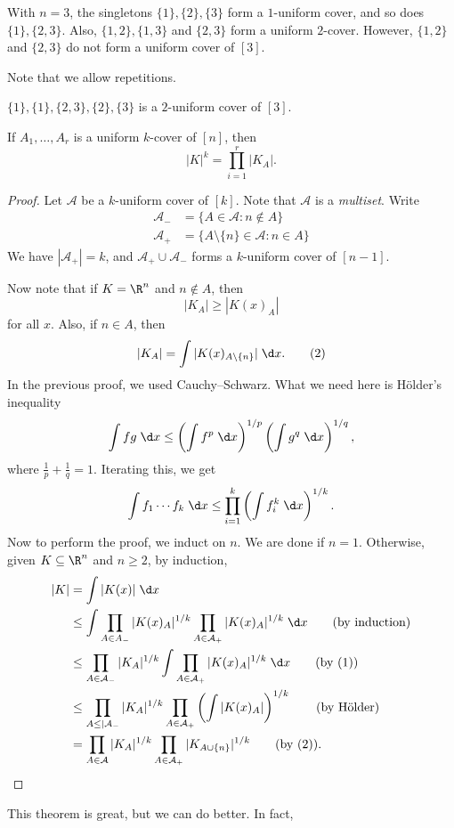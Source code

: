 \documentclass[a4paper]{article}
\begin{document}
\begin{eg}
  With $n = 3$, the singletons $\{1\}, \{2\}, \{3\}$ form a $1$-uniform cover, and so does $\{1\}, \{2, 3\}$. Also, $\{1, 2\}, \{1, 3\}$ and $\{2, 3\}$ form a uniform $2$-cover. However, $\{1, 2\}$ and $\{2, 3\}$ do not form a uniform cover of $[3]$.
\end{eg}
Note that we allow repetitions.
\begin{eg}
  $\{1\}, \{1\}, \{2, 3\}, \{2\}, \{3\}$ is a $2$-uniform cover of $[3]$.
\end{eg}

\begin{thm}
  If $A_1, \ldots, A_r$ is a uniform $k$-cover of $[n]$, then
  \[
    |K|^k = \prod_{i = 1}^r |K_A|.
  \]
\end{thm}

\begin{proof}
  Let $\mathcal{A}$ be a $k$-uniform cover of $[k]$. Note that $\mathcal{A}$ is a \emph{multiset}. Write
  \begin{align*}
    \mathcal{A}_- &= \{A \in \mathcal{A}: n \not \in A\}\\
    \mathcal{A}_+ &= \{A \setminus \{n\} \in \mathcal{A}: n \in A\}
  \end{align*}
  We have $|\mathcal{A}_+| = k$, and $\mathcal{A}_+ \cup \mathcal{A}_-$ forms a $k$-uniform cover of $[n - 1]$.

  Now note that if $K = \R^n$ and $n \not \in A$, then
  \[
    |K_A| \geq |K(x)_A|\tag{1}
  \]
  for all $x$. Also, if $n \in A$, then
  \[
    |K_A| = \int |K(x)_{A \setminus \{n\}}|\;\d x.\tag{2}
  \]
  In the previous proof, we used Cauchy--Schwarz. What we need here is H\"older's inequality
  \[
    \int fg\;\d x \leq \left(\int f^p\;\d x\right)^{1/p} \left(\int g^q\;\d x\right)^{1/q},
  \]
  where $\frac{1}{p} + \frac{1}{q} = 1$. Iterating this, we get
  \[
    \int f_1 \cdots f_k\;\d x\leq \prod_{i = 1}^k \left(\int f_i^k\;\d x\right)^{1/k}.
  \]
  Now to perform the proof, we induct on $n$. We are done if $n = 1$. Otherwise, given $K \subseteq \R^n$ and $n \geq 2$, by induction,
  \begin{align*}
    |K| &= \int |K(x)|\;\d x \\
    &\leq \int \prod_{A \in A_-} |K(x)_A|^{1/k} \prod_{A \in \mathcal{A}_+} |K(x)_A|^{1/k}\;\d x\tag{by induction}\\
    &\leq \prod_{A \in \mathcal{A}_-} |K_A|^{1/k} \int \prod_{A \in \mathcal{A}_+}|K(x)_A|^{1/k}\;\d x\tag{by (1)}\\
    &\leq \prod_{A \leq |\mathcal{A}_-} |K_A|^{1/k} \prod_{A \in \mathcal{A}_+} \left(\int |K(x)_A|\right)^{1/k} \tag{by H\"older}\\
    &= \prod_{A \in \mathcal{A}} |K_A|^{1/k} \prod_{A \in \mathcal{A}_+} |K_{A \cup \{n\}}|^{1/k}\tag{by (2)}.
  \end{align*}
\end{proof}
This theorem is great, but we can do better. In fact,
\end{document}
